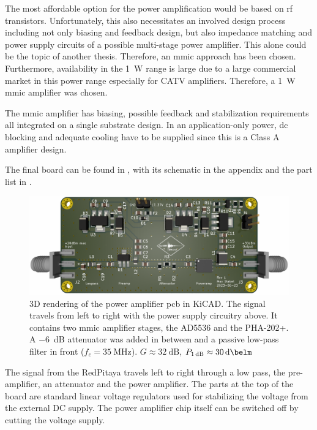 The most affordable option for the power amplification would be based on \acrshort{rf} transistors. Unfortunately, this also necessitates an involved design process including not only biasing and feedback design, but also impedance matching and power supply circuits of a possible multi-stage power amplifier. This alone could be the topic of another thesis. Therefore, an \acrshort{mmic} approach has been chosen. Furthermore, availability in the \qty{1}{\watt} range is large due to a large commercial market in this power range especially for CATV amplifiers. Therefore, a \qty{1}{\watt} \acrshort{mmic} amplifier was chosen.

The \acrfull{mmic} amplifier has biasing, possible feedback and stabilization requirements all integrated on a single substrate design. In an application-only power, \acrshort{dc} blocking and adequate cooling have to be supplied since this is a Class A amplifier design.

The final board can be found in , with its schematic in the appendix  and the part list in .

\begin{figure}[hbt]
    \centering
    \includegraphics{images/poweramp.png}
    \caption{ 3D rendering of the power amplifier \acrshort{pcb} in KiCAD. The signal travels from left to right with the power supply circuitry above. It contains two \acrshort{mmic} amplifier stages, the AD5536 and the PHA-202+. A \qty{-6}{\deci\bel} attenuator was added in between and a passive low-pass filter in front (\(f_c = \qty{35}{\mega\hertz}\)). \(G \approx \qty{32}{\deci\bel}\), \(P_{\qty{1}{\deci\bel}} \approx \qty{+30}{\deci\belm}\)}
\end{figure}

The signal from the RedPitaya travels left to right through a low pass, the pre-amplifier, an attenuator and the power amplifier. The parts at the top of the board are standard linear voltage regulators used for stabilizing the voltage from the external DC supply. The power amplifier chip itself can be switched off by cutting the voltage supply.

